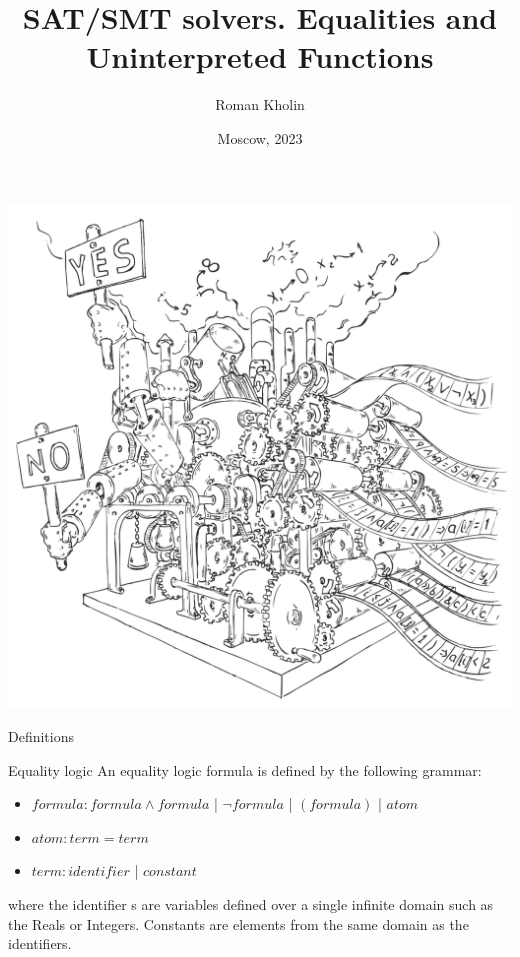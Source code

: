 \documentclass{beamer}
\begin{document}
\title{SAT/SMT solvers. Equalities and Uninterpreted Functions}
\author{Roman Kholin}
\date{Moscow, 2023}

\begin{frame}
\includegraphics[scale=0.5]{../decision-procedure.png}
\end{frame}

\frame{\titlepage}

\begin{frame}{Definitions}
\begin{block}{Equality logic}
An equality logic formula is defined by the following grammar:
\begin{itemize}
\item $formula: formula \wedge formula$ | $\lnot formula$ | $(formula)$ | $atom$
\item $atom : term = term$
\item $term : identifier$ | $constant$
\end{itemize}
where the identifier s are variables defined over a single infinite domain such as the Reals or Integers. Constants are elements from the same domain as the identifiers.
\end{block}
\end{frame}
\end{document}
